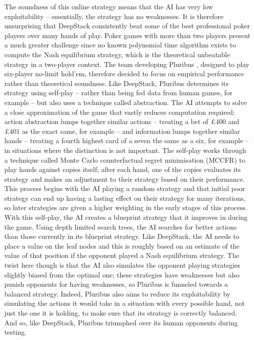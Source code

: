 \documentclass{article}
\begin{document}
\begin{multicols*}{2}
\newline
The soundness of this online strategy means that the AI has very low exploitability – essentially, the strategy has no weaknesses. It is therefore unsurprising that DeepStack consistently beat some of the best professional poker players over many hands of play.
\newline
Poker games with more than two players present a much greater challenge since no known polynomial time algorithm exists to compute the Nash equilibrium strategy, which is the theoretical unbeatable strategy in a two-player context. The team developing Pluribus \cite{Pluribus}, designed to play six-player no-limit hold’em, therefore decided to focus on empirical performance rather than theoretical soundness. Like DeepStack, Pluribus determines its strategy using self-play – rather than being fed data from human games, for example – but also uses a technique called abstraction. The AI attempts to solve a close approximation of the game that vastly reduces computation required: action abstraction lumps together similar actions – treating a bet of £400 and £401 as the exact same, for example – and information lumps together similar hands – treating a fourth highest card of a seven the same as a six, for example – in situations where the distinction is not important.
\newline
The self-play works through a technique called Monte Carlo counterfactual regret minimisation (MCCFR) to play hands against copies itself; after each hand, one of the copies evaluates its strategy and makes an adjustment to their strategy based on their performance. This process begins with the AI playing a random strategy and that initial poor strategy can end up having a lasting effect on their strategy for many iterations, so later strategies are given a higher weighting in the early stages of this process. With this self-play, the AI creates a blueprint strategy that it improves in during the game.
\newline
Using depth limited search trees, the AI searches for better actions than those currently in its blueprint strategy. Like DeepStack, the AI needs to place a value on the leaf nodes and this is roughly based on an estimate of the value of that position if the opponent played a Nash equilibrium strategy. The twist here though is that the AI also simulates the opponent playing strategies slightly biased from the optimal one; these strategies have weaknesses but also punish opponents for having weaknesses, so Pluribus is funneled towards a balanced strategy. Indeed, Pluribus also aims to reduce its exploitability by simulating the actions it would take in a situation with every possible hand, not just the one it is holding, to make sure that its strategy is correctly balanced. And so, like DeepStack, Pluribus triumphed over its human opponents during testing.

\end{multicols*}
\end{document}
